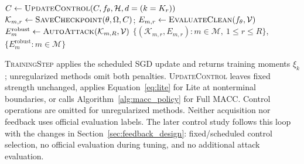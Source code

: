 \documentclass[10pt,a4paper,twocolumn]{article}
\begin{document}
\begin{algorithm*}[tbp]
\begin{algorithmic}[1]
                \State $C\gets\Call{UpdateControl}{C,f_\theta,\mathcal H,d=(k=K_r)}$
            \EndIf
        \EndFor
        \State $\mathcal K_{m,r}\gets\Call{SaveCheckpoint}{\theta,\Omega,C}$;
            $E_{m,r}\gets\Call{EvaluateClean}{f_\theta,\mathcal V}$
    \EndFor
    \State $E_m^{\mathrm{robust}}\gets\Call{AutoAttack}{\mathcal K_{m,R},\mathcal V}$
\EndFor
\State \Return $\{(\mathcal K_{m,r},E_{m,r}):m\in\mathcal M,\ 1\le r\le R\}$,
    $\{E_m^{\mathrm{robust}}:m\in\mathcal M\}$
\end{algorithmic}
\vspace{2pt}
\noindent\footnotesize
\textsc{TrainingStep} applies the scheduled SGD update and returns training
moments $\xi_k$; unregularized methods omit both penalties.
\textsc{UpdateControl} leaves fixed strength unchanged, applies
Equation~\eqref{eq:lite} for Lite at nonterminal boundaries, or calls
Algorithm~\ref{alg:macc_policy} for Full MACC. Control operations are omitted
for unregularized methods. Neither acquisition nor feedback uses official
evaluation labels. The later control study follows this loop with the changes in
Section~\ref{sec:feedback_design}: fixed/scheduled control selection, no official
evaluation during tuning, and no additional attack evaluation.
\end{algorithm*}
\end{document}

